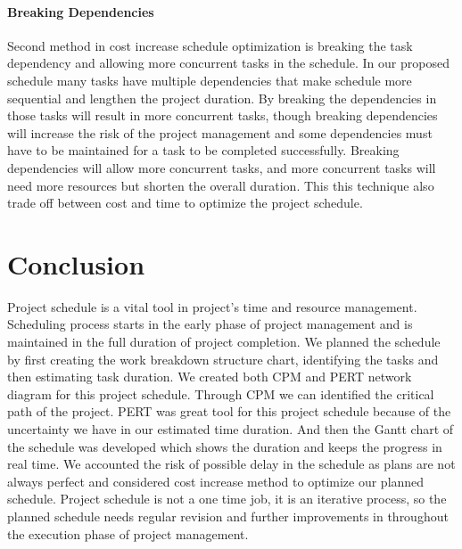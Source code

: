 \begin{spacing}{1}
\paragraph{Breaking Dependencies} Second method in cost increase schedule optimization is breaking the task dependency and allowing more concurrent tasks in the schedule. In our proposed schedule many tasks have multiple dependencies that make schedule more sequential and lengthen the project duration. By breaking the dependencies in those tasks will result in more concurrent tasks, though breaking dependencies will increase the risk of the project management and some dependencies must have to be maintained for a task to be completed successfully. Breaking dependencies will allow more concurrent tasks, and more concurrent  tasks will need more resources but shorten the overall duration. This this technique also trade off between cost and time to optimize the project schedule.

\section{Conclusion}  
Project schedule is a vital tool in project's time and resource management. Scheduling process starts in the early phase of project management and is maintained in the full duration of project completion. We planned the schedule by first creating the work breakdown structure chart, identifying the tasks and then estimating task duration. We created both CPM and PERT network diagram for this project schedule. Through CPM we can identified the critical path of the project. PERT was great tool for this project schedule because of the uncertainty we have in our estimated time duration. And then the Gantt chart of the schedule was developed which shows the duration and keeps the progress in real time. We accounted the risk of possible delay in the schedule as plans are not always perfect and considered cost increase method to optimize our planned schedule. Project schedule is not a one time job, it is an iterative process, so the planned schedule needs regular revision and further improvements in throughout the execution phase of project management.
  
\end{spacing}